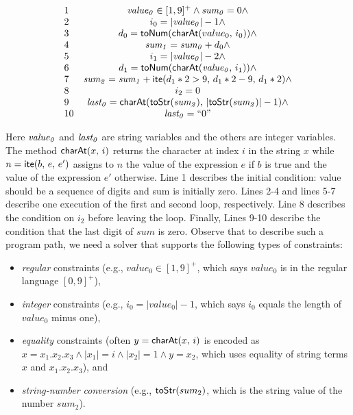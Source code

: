 \documentclass[sigplan,review,anonymous]{acmart}\settopmatter{printfolios=true,printccs=false,printacmref=false}
\begin{document}
$$\begin{array}{lc}
1&	{\it value_0} \in [1,9]^+ \wedge 	{\it sum_0} = 0 \wedge \\
2&	i_0 = |{\it value_0}| -1 \wedge \\
3&	d_0 = \mbox{\textsf{toNum}($\mbox{\textsf{charAt}($value_0$, $i_0$)}$)} \wedge \\
4&	{\it sum_1} = {\it sum_0} + d_0 \wedge\\
5&	i_1 = |{\it value_0}| -2 \wedge \\
6&	d_1 = \mbox{\textsf{toNum}($\mbox{\textsf{charAt}(${\it value_0}$, $i_1$)}$)} \wedge \\
7&	{\it sum_2} = {\it sum_1} + \mbox{\textsf{ite}($d_1*2>9$, $d_1*2 -9$, $d_1*2$)} \wedge\\
8& i_2 = 0\\
9&	{\it last_0} = \mbox{\textsf{charAt}($\mbox{\textsf{toStr}(${\it sum_2}$)}$, $|\mbox{\textsf{toStr}(${\it sum_2}$)}|-1$)} \wedge\\
10&	{\it last_0} =``0"
\end{array}$$

Here ${\it value_0}$ and ${\it last_0}$ are string variables and the others are integer variables. The method $\mbox{\textsf{charAt}($x$, $i$)}$ returns the character at index $i$ in the string $x$ while $n=\mbox{\textsf{ite}($b$, $e$, $e'$)}$ assigns to $n$ the value of the expression $e$ if $b$ is true and the value of the expression $e'$ otherwise. Line 1 describes the initial condition: \textsf{value} should be a sequence of digits and \textsf{sum} is initially zero. Lines 2-4 and lines 5-7 describe one execution of the first and second loop, respectively. Line 8 describes the condition on $i_2$ before leaving the loop. Finally, Lines 9-10 describe the condition that the last digit of $sum$ is zero. Observe that to describe such a program path, we need a solver that supports the following types of constraints:
\begin{itemize}
	\item \emph{regular} constraints (e.g., $value_0 \in [1,9]^+$, which says $value_0$ is in the regular language $[0,9]^+$),
	\item \emph{integer} constraints (e.g., $i_0 = |value_0| -1$, which says $i_0$ equals the length of $value_0$ minus one),
	\item \emph{equality} constraints (often $y=\mbox{\textsf{charAt}($x$, $i$)}$ is encoded as $x=x_1.x_2.x_3 \wedge |x_1| = i \wedge |x_2| =1 \wedge y= x_2$, which uses equality of string terms $x$ and $x_1.x_2.x_3$), and
	\item \emph{string-number conversion} (e.g., $\mbox{\textsf{toStr}($sum_2$)}$, which is the string value of the number $sum_2$).
\end{itemize}
\end{document}

